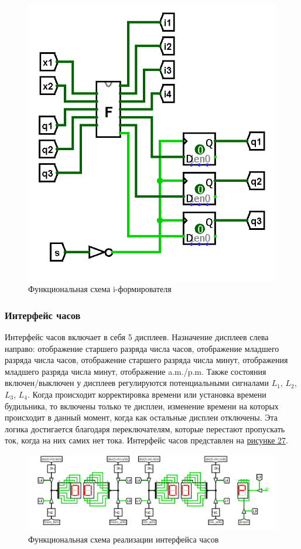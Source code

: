 \documentclass[11pt,a4paper,final]{article} %
\begin{document}
\begin{figure}[H]
	\centering
	\includegraphics[width=0.65 \linewidth]{img/i-converter.png}
	\caption{Функциональная схема i-формирователя}
	\label{fig:icov}
\end{figure}


\subsubsection{Интерфейс часов}

Интерфейс часов включает в себя 5 дисплеев. Назначение дисплеев слева направо: отображение старшего разряда числа часов, отображение младшего разряда числа часов, отображение старшего разряда числа минут, отображения младшего разряда числа минут, отображение a.m./p.m. Также состояния включен/выключен у дисплеев регулируются потенциальными сигналами $L_1$, $L_2$, $L_3$, $L_4$. Когда происходит корректировка времени или установка времени будильника, то включены только те дисплеи, изменение времени на которых происходит в данный момент, когда как остальные дисплеи отключены. Эта логика достигается благодаря переключателям, которые перестают пропускать ток, когда на них самих нет тока. Интерфейс часов представлен на \hyperref[fig:watch]{рисунке 27}.


\begin{figure}[H]
	\centering
	\includegraphics[width=1.0 \linewidth]{img/watch.png}
	\caption{Функциональная схема реализации интерфейса часов}
	\label{fig:watch}
\end{figure}
\end{document}
